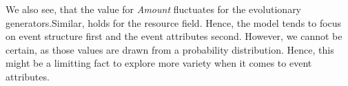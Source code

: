 \documentclass[./../../paper.tex]{subfiles}
\begin{document}
%     
    
%     
    

We also see, that the value for \emph{Amount} fluctuates for the evolutionary generators.Similar, holds for the resource field. Hence, the model tends to focus on event structure first and the event attributes second. However, we cannot be certain, as those values are drawn from a probability distribution. Hence, this might be a limitting fact to explore more variety when it comes to event attributes. 





\end{document}
